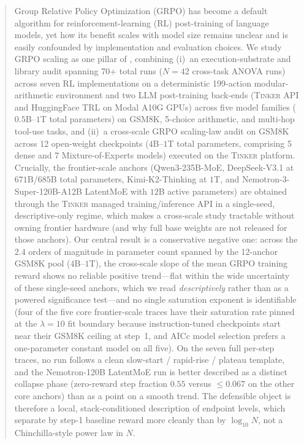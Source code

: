 \begin{abstract}
Group Relative Policy Optimization (GRPO) has become a default algorithm for
reinforcement-learning (RL) post-training of language models, yet how its benefit
scales with model size remains unclear and is easily confounded by implementation
and evaluation choices. We study GRPO scaling as one pillar of \ours{}, combining
(i)~an execution-substrate and library audit spanning 70+ total runs ($N=42$ cross-task ANOVA runs)
across seven RL implementations on a deterministic 199-action modular-arithmetic environment
and two LLM post-training back-ends (\textsc{Tinker} API and HuggingFace \textsc{TRL} on Modal A10G GPUs)
across five model families ($0.5$B--$1$T total parameters) on GSM8K, 5-choice arithmetic, and multi-hop tool-use tasks, and
(ii)~a cross-scale GRPO scaling-law audit on GSM8K across 12 open-weight checkpoints ($4$B--$1$T total parameters,
comprising 5 dense and 7 Mixture-of-Experts models) executed on the \textsc{Tinker} platform.
Crucially, the frontier-scale anchors (Qwen3-235B-MoE, DeepSeek-V3.1 at $671$B/$685$B total parameters,
Kimi-K2-Thinking at $1$T, and Nemotron-3-Super-120B-A12B LatentMoE with $12$B active parameters) are obtained through the \textsc{Tinker} managed
training/inference API in a single-seed, descriptive-only regime, which makes a
cross-scale study tractable without owning frontier hardware (and why full
base weights are not released for those anchors).
Our central result is a conservative negative one: across the $2.4$ orders of
magnitude in parameter count spanned by the 12-anchor GSM8K pool ($4$B--$1$T),
the cross-scale slope of the mean GRPO training
reward shows no reliable positive trend---flat within the wide uncertainty of
these single-seed anchors, which we read \emph{descriptively}
rather than as a powered significance test---and no single saturation exponent is identifiable
(four of the five core frontier-scale traces have their saturation rate pinned at the
$\lambda=10$ fit boundary because instruction-tuned checkpoints start near their GSM8K ceiling at step~1, and AICc model selection prefers a one-parameter constant model on all five).
On the seven full per-step traces, no run follows a clean slow-start /
rapid-rise / plateau template, and the Nemotron-120B LatentMoE run
is better described as a distinct collapse phase (zero-reward step fraction $0.55$
versus $\le 0.067$ on the other core anchors) than as a point on a smooth trend. The defensible
object is therefore a local, stack-conditioned description of endpoint levels,
which separate by step-1 baseline reward more cleanly than by $\log_{10} N$,
not a Chinchilla-style power law in $N$.

\end{abstract}
